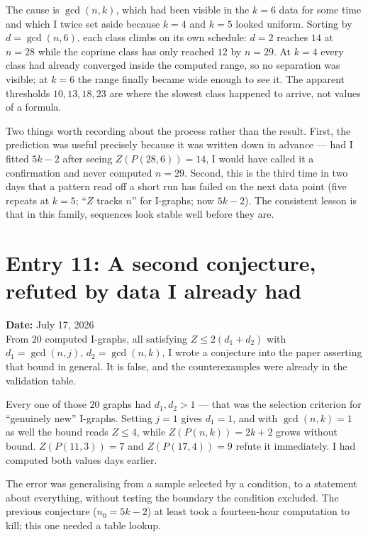 \documentclass[12pt]{article}
\begin{document}
The cause is $\gcd(n,k)$, which had been visible in the $k=6$ data for some
time and which I twice set aside because $k=4$ and $k=5$ looked uniform.
Sorting by $d=\gcd(n,6)$, each class climbs on its own schedule: $d=2$ reaches
$14$ at $n=28$ while the coprime class has only reached $12$ by $n=29$. At
$k=4$ every class had already converged inside the computed range, so no
separation was visible; at $k=6$ the range finally became wide enough to see
it. The apparent thresholds $10,13,18,23$ are where the slowest class happened
to arrive, not values of a formula.

Two things worth recording about the process rather than the result. First,
the prediction was useful precisely because it was written down in advance ---
had I fitted $5k-2$ after seeing $Z(P(28,6))=14$, I would have called it a
confirmation and never computed $n=29$. Second, this is the third time in two
days that a pattern read off a short run has failed on the next data point
(five repeats at $k=5$; ``$Z$ tracks $n$'' for I-graphs; now $5k-2$). The
consistent lesson is that in this family, sequences look stable well before
they are.



\clearpage
\section*{Entry 11: A second conjecture, refuted by data I already had}
\textbf{Date:} July 17, 2026\\
From $20$ computed I-graphs, all satisfying $Z\le2(d_1+d_2)$ with
$d_1=\gcd(n,j)$, $d_2=\gcd(n,k)$, I wrote a conjecture into the paper
asserting that bound in general. It is false, and the counterexamples were
already in the validation table.

Every one of those $20$ graphs had $d_1,d_2>1$ --- that was the selection
criterion for ``genuinely new'' I-graphs. Setting $j=1$ gives $d_1=1$, and with
$\gcd(n,k)=1$ as well the bound reads $Z\le4$, while $Z(P(n,k))=2k+2$ grows
without bound. $Z(P(11,3))=7$ and $Z(P(17,4))=9$ refute it immediately. I had
computed both values days earlier.

The error was generalising from a sample selected by a condition, to a
statement about everything, without testing the boundary the condition
excluded. The previous conjecture ($n_0=5k-2$) at least took a fourteen-hour
computation to kill; this one needed a table lookup.
\end{document}
